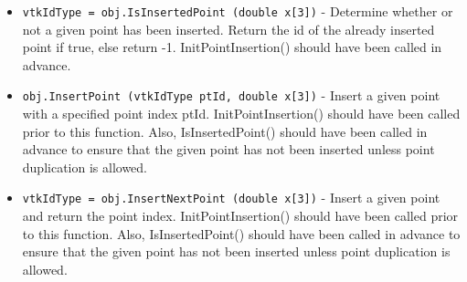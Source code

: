 \begin{itemize}
\item  \verb|vtkIdType = obj.IsInsertedPoint (double x[3])| -  Determine whether or not a given point has been inserted. Return the id of 
 the already inserted point if true, else return -1. InitPointInsertion()
 should have been called in advance.

\item  \verb|obj.InsertPoint (vtkIdType ptId, double x[3])| -  Insert a given point with a specified point index ptId. InitPointInsertion()
 should have been called prior to this function. Also, IsInsertedPoint()
 should have been called in advance to ensure that the given point has not 
 been inserted unless point duplication is allowed.

\item  \verb|vtkIdType = obj.InsertNextPoint (double x[3])| -  Insert a given point and return the point index. InitPointInsertion()
 should have been called prior to this function. Also, IsInsertedPoint() 
 should have been called in advance to ensure that the given point has not
 been inserted unless point duplication is allowed.

\end{itemize}
